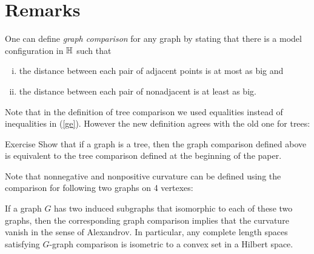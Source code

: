 \section{Remarks}


One can define \emph{graph comparison} for any graph by stating that there is a model configuration in $\mathbb{H}$ such that 
\begin{enumerate}[(i)]
\item\label{ge} the distance between each pair of adjacent points is at most as big 
and
\item the distance between each pair of nonadjacent is at least as big.
\end{enumerate}

Note that in the definition of tree comparison we used equalities instead of inequalities in (\ref{ge}). 
However the new definition agrees with the old one for  trees: 

\begin{thm}{Exercise}
Show that if a graph is a tree, then the graph comparison defined above is equivalent to the tree comparison defined at the beginning of the paper.
\end{thm}


Note that nonnegative and nonpositive curvature can be defined using the comparison for following two graphs on 4 vertexes:

\begin{center}
\hskip30mm
\end{center}
If a graph $G$ has two induced subgraphs that isomorphic to each of these two graphs, then the corresponding graph comparison implies that the curvature vanish in the sense of Alexandrov.
In particular, any complete length spaces satisfying $G$-graph comparison is isometric to a convex set in a Hilbert space. 

